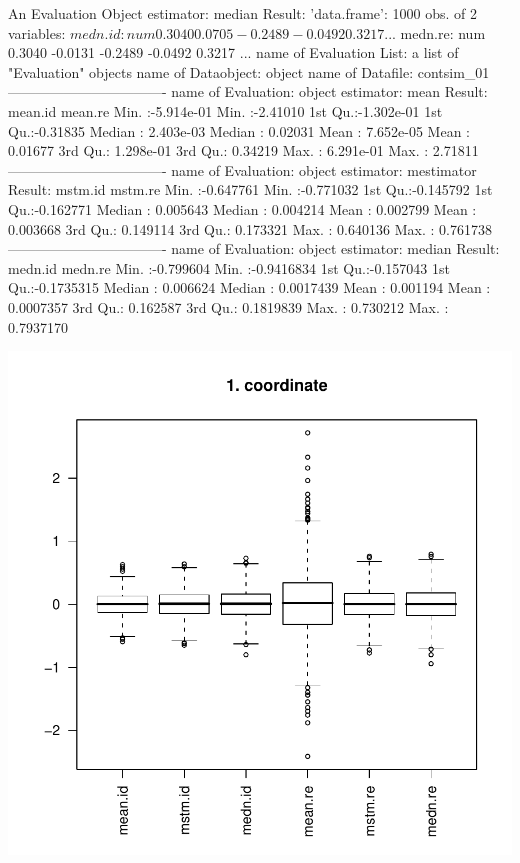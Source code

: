 \documentclass[11pt]{article}
\begin{document}
\begin{Schunk}
\begin{Soutput}
An Evaluation Object
estimator: median
Result: 'data.frame':   1000 obs. of  2 variables:
 $ medn.id: num   0.3040  0.0705 -0.2489 -0.0492  0.3217 ...
 $ medn.re: num   0.3040 -0.0131 -0.2489 -0.0492  0.3217 ...
name of Evaluation List: a list of "Evaluation" objects
name of Dataobject: object
name of Datafile: contsim_01
----------------------------------
name of Evaluation: object
estimator: mean
Result:
    mean.id              mean.re
 Min.   :-5.914e-01   Min.   :-2.41010
 1st Qu.:-1.302e-01   1st Qu.:-0.31835
 Median : 2.403e-03   Median : 0.02031
 Mean   : 7.652e-05   Mean   : 0.01677
 3rd Qu.: 1.298e-01   3rd Qu.: 0.34219
 Max.   : 6.291e-01   Max.   : 2.71811
----------------------------------
name of Evaluation: object
estimator: mestimator
Result:
    mstm.id             mstm.re
 Min.   :-0.647761   Min.   :-0.771032
 1st Qu.:-0.145792   1st Qu.:-0.162771
 Median : 0.005643   Median : 0.004214
 Mean   : 0.002799   Mean   : 0.003668
 3rd Qu.: 0.149114   3rd Qu.: 0.173321
 Max.   : 0.640136   Max.   : 0.761738
----------------------------------
name of Evaluation: object
estimator: median
Result:
    medn.id             medn.re
 Min.   :-0.799604   Min.   :-0.9416834
 1st Qu.:-0.157043   1st Qu.:-0.1735315
 Median : 0.006624   Median : 0.0017439
 Mean   : 0.001194   Mean   : 0.0007357
 3rd Qu.: 0.162587   3rd Qu.: 0.1819839
 Max.   : 0.730212   Max.   : 0.7937170
\end{Soutput}
\end{Schunk}
\includegraphics{distr-elist}
\end{document}
